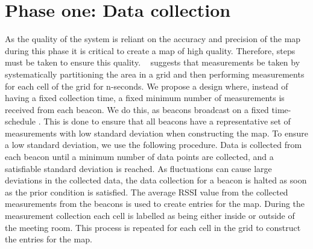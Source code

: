 \section{Phase one: Data collection}\label{sec:first_phase}
As the quality of the system is reliant on the accuracy and precision of the map during this phase it is critical to create a map of high quality.
Therefore, steps must be taken to ensure this quality. 
\citeauthor{improving_indoor_localization}~\cite{improving_indoor_localization} suggests that measurements be taken by systematically partitioning the area in a grid and then performing measurements for each cell of the grid for n-seconds. 
We propose a design where, instead of having a fixed collection time, a fixed minimum number of measurements is received from each beacon.
We do this, as beacons broadcast on a fixed time-schedule \cite{apple2023ibeacon}.
This is done to ensure that all beacons have a representative set of measurements with low standard deviation when constructing the map.
To ensure a low standard deviation, we use the following procedure.
Data is collected from each beacon until a minimum number of data points are collected, and a  satisfiable standard deviation is reached.
As fluctuations can cause large deviations in the collected data, the data collection for a beacon is halted as soon as the prior condition is satisfied.
The average RSSI value from the collected measurements from the beacons is used to create entries for the map.
During the measurement collection each cell is labelled as being either inside or outside of the meeting room.
This process is repeated for each cell in the grid to construct the entries for the map. 


